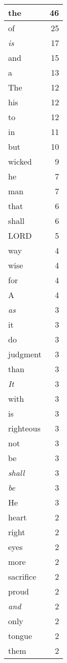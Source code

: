 \begin{center}
\begin{longtable}{l|r}
the & 46\\ \hline 
of & 25\\ \hline 
\emph{is} & 17\\ \hline 
and & 15\\ \hline 
a & 13\\ \hline 
The & 12\\ \hline 
his & 12\\ \hline 
to & 12\\ \hline 
in & 11\\ \hline 
but & 10\\ \hline 
wicked & 9\\ \hline 
he & 7\\ \hline 
man & 7\\ \hline 
that & 6\\ \hline 
shall & 6\\ \hline 
LORD & 5\\ \hline 
way & 4\\ \hline 
wise & 4\\ \hline 
for & 4\\ \hline 
A & 4\\ \hline 
\emph{as} & 3\\ \hline 
it & 3\\ \hline 
do & 3\\ \hline 
judgment & 3\\ \hline 
than & 3\\ \hline 
\emph{It} & 3\\ \hline 
with & 3\\ \hline 
is & 3\\ \hline 
righteous & 3\\ \hline 
not & 3\\ \hline 
be & 3\\ \hline 
\emph{shall} & 3\\ \hline 
\emph{be} & 3\\ \hline 
He & 3\\ \hline 
heart & 2\\ \hline 
right & 2\\ \hline 
eyes & 2\\ \hline 
more & 2\\ \hline 
sacrifice & 2\\ \hline 
proud & 2\\ \hline 
\emph{and} & 2\\ \hline 
only & 2\\ \hline 
tongue & 2\\ \hline 
them & 2\\ \hline 

\end{longtable}
\end{center}
